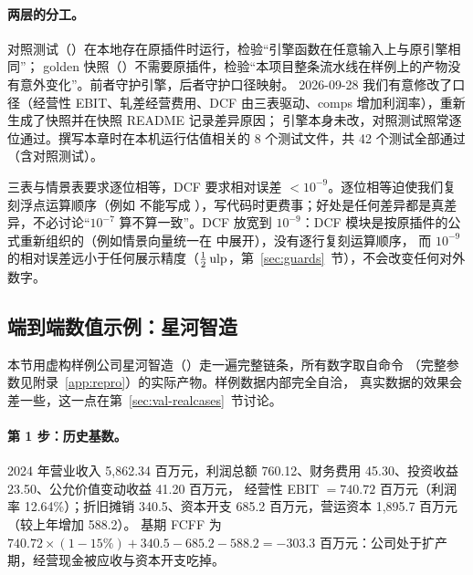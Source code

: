 \paragraph{两层的分工。} 对照测试（）在本地存在原插件时运行，检验“引擎函数在任意输入上与原引擎相同”；
golden 快照（）不需要原插件，检验“本项目整条流水线在样例上的产物没有意外变化”。前者守护引擎，后者守护口径映射。
2026-09-28 我们有意修改了口径（经营性 EBIT、轧差经营费用、DCF 由三表驱动、comps 增加利润率），重新生成了快照并在快照 README 记录差异原因；
引擎本身未改，对照测试照常逐位通过。撰写本章时在本机运行估值相关的 8 个测试文件，共 42 个测试全部通过（含对照测试）。

\begin{tradeoff}
三表与情景表要求逐位相等，DCF 要求相对误差 $<10^{-9}$。逐位相等迫使我们复刻浮点运算顺序（例如  不能写成
），写代码时更费事；好处是任何差异都是真差异，不必讨论“$10^{-7}$ 算不算一致”。DCF 放宽到 $10^{-9}$：DCF 模块是按原插件的公式重新组织的（例如情景向量统一在  中展开），没有逐行复刻运算顺序，
而 $10^{-9}$ 的相对误差远小于任何展示精度（$\tfrac12\operatorname{ulp}$，第~\ref{sec:guards}~节），不会改变任何对外数字。
\end{tradeoff}

\subsection{端到端数值示例：星河智造}
\label{sec:val-example}

本节用虚构样例公司星河智造（）走一遍完整链条，所有数字取自命令
（完整参数见附录~\ref{app:repro}）的实际产物。样例数据内部完全自洽，
真实数据的效果会差一些，这一点在第~\ref{sec:val-realcases}~节讨论。

\paragraph{第 1 步：历史基数。} 2024 年营业收入 5,862.34 百万元，利润总额 760.12、财务费用 45.30、投资收益 23.50、公允价值变动收益 41.20 百万元，
经营性 EBIT $=740.72$ 百万元（利润率 12.64\%）；折旧摊销 340.5、资本开支 685.2 百万元，营运资本 1,895.7 百万元（较上年增加 588.2）。
基期 FCFF 为 $740.72\times(1-15\%)+340.5-685.2-588.2=-303.3$ 百万元：公司处于扩产期，经营现金被应收与资本开支吃掉。

